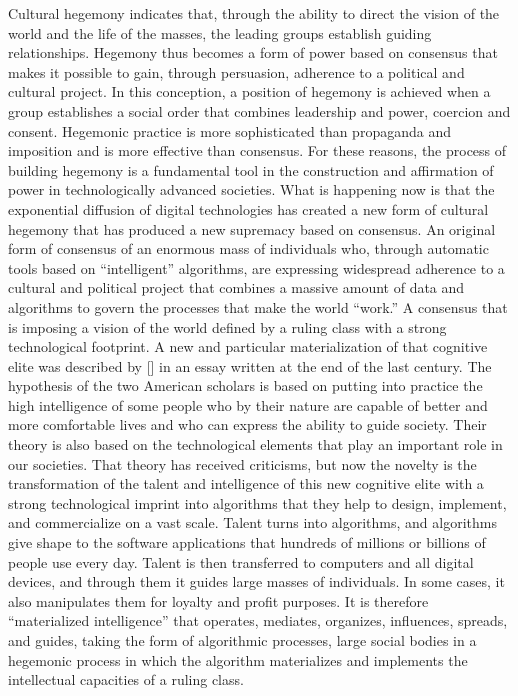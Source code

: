 Cultural hegemony indicates that, through the ability to direct the vision of the world and the life of the masses, the leading groups establish guiding relationships. Hegemony thus becomes a form of power based on consensus that makes it possible to gain, through persuasion, adherence to a political and cultural project. In this conception, a position of hegemony is achieved when a group establishes a social order that combines leadership and power, coercion and consent. Hegemonic practice is more sophisticated than propaganda and imposition and is more effective than consensus. For these reasons, the process of building hegemony is a fundamental tool in the construction and affirmation of power in technologically advanced societies. What is happening now is that the exponential diffusion of digital technologies has created a new form of cultural hegemony that has \hbox{produced} a new supremacy based on consensus. An original form of consensus of an enormous mass of individuals who, through automatic tools based on ``intelligent'' algorithms, are expressing widespread adherence to a cultural and political project that combines a massive amount of data and algorithms to govern the processes that make the world ``work.'' A consensus that is imposing a vision of the world defined by a ruling class with a strong technological footprint. A new and particular materialization of that cognitive elite was described by \citeauthor{chap:8:HerrnsteinandMurray:1994} [\citeyear{chap:8:HerrnsteinandMurray:1994}] in an essay written at the end of the last century. The hypothesis of the two American scholars is based on putting into practice the high intelligence of some people who by their nature are capable of better and more comfortable lives and who can express the ability to guide society. Their theory is also based on the technological elements that play an important role in our societies. That theory has received criticisms, but now the novelty is the transformation of the talent and intelligence of this new cognitive elite with a strong technological imprint into algorithms that they help to design, implement, and commercialize on a vast scale. Talent turns into algorithms, and algorithms give shape to the software applications that hundreds of millions or billions of people use every day. Talent is then transferred to computers and all digital devices, and through them it guides large masses of individuals. In some cases, it also manipulates them for loyalty and profit purposes. It is therefore ``materialized intelligence'' that operates, mediates, organizes, influences, spreads, and guides, taking the form of algorithmic processes, large social bodies in a hegemonic process in which the algorithm materializes and implements the intellectual capacities of a ruling class.

